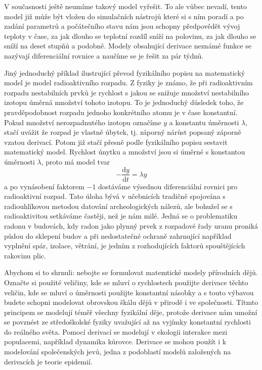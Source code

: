 \documentclass[12pt]{article}
\begin{document}
V současnosti ještě neumíme takový model vyřešit. To ale vůbec nevadí, tento model již může být vložen do simulačních nástrojů které si s ním poradí a po zadání parametrů a počátečního stavu nám jsou schopny předpovědět vývoj teploty v čase, za jak dlouho se teplotní rozdíl sníží na polovinu, za jak dlouho se sníží na deset stupňů a podobně. Modely obsahující derivace neznámé funkce se nazývají diferenciální rovnice a naučíme se je řešit za pár týdnů.

Jiný jednoduchý příklad ilustrující převod fyzikálního popisu na matematický model je model radioaktivního rozpadu. Z fyziky je známo, že při radioaktivním rozpadu nestabilních prvků je rychlost s jakou se snižuje množství nestabilního izotopu úměrná množství tohoto izotopu. To je jednoduchý důsledek toho, že pravděpodobnost rozpadu jednoho konkrétního atomu je v čase konstantní. Pokud množství nerozpadnutého izotopu označíme $y$ a konstantu úměrnosti $\lambda$, stačí uvážit že rozpad je vlastně úbytek, tj. záporný nárůst popsaný záporně vzatou derivací. Potom již stačí přesně podle fyzikálního popisu sestavit matematický model. Rychlost únytku a množství jsou si úměrné s konstantou úměrnosti $\lambda$, proto má model tvar $$-\frac{\mathrm dy}{\mathrm dt}=\lambda y$$ a po vynásobení faktorem $-1$ dostáváme výsednou diferenciální rovnici pro radioaktivní rozpad. Tato úloha bývá v učebnicích tradičně spojována s radiouhlíkovou metodou datování archeologických nálezů, ale bohužel se s radioaktivitou setkáváme častěji, než je nám milé. Jedná se o problematiku radonu v budovách, kdy radon jako plynný prvek z rozpadové řady uranu proniká půdou do sklepení budov a při nedostatečné ochraně zahrnující například vyplnění spár, izolace, větrání, je jedním z rozhodujících faktorů spouštějících rakovinu plic.

Abychom si to shrnuli: nebojte se formulovat matemtické modely přírodních dějů. Označte si použité veličiny, kde se mluví o rychlostech použijte derivace těchto veličin, kde se mluví o úměrnosti použijte konstantní násobky a s touto výbavou budete schopni modelovat obrovskou škálu dějů v přirodě i ve společnosti. Títmto principem se modelují téměř všechny fyzikální děje, protože derivace nám umožní se povznést ze středoškolské fyziky uvažující až na vyjímky konstantní rychlosti do reálného světa. Pomocí derivací se modelují v ekologii interakce mezi populacemi, například dynamika kůrovce. Derivace se mohou použít i k modelování společenských jevů, jedna z podoblastí modelů založených na derivacích je teorie epidemií.
\end{document}
